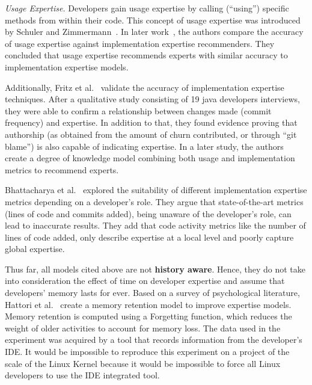 \textit{Usage Expertise.} Developers gain usage expertise by calling (``using'') specific methods from within their code. This concept of usage expertise was introduced by Schuler and Zimmermann~\cite{Schuler:2008:MUE:1370750.1370779}. In later work~\cite{5306386}, the authors compare the accuracy of usage expertise against implementation expertise recommenders. They concluded that usage expertise recommends experts with similar accuracy to implementation expertise models. 

Additionally, Fritz et al.~\cite{Fritz-2007} validate the accuracy of implementation expertise techniques. After a qualitative study consisting of  19 java developers interviews, they were able to confirm a relationship between changes made (commit frequency) and expertise. In addition to that, they found evidence proving that authorship (as obtained from the amount of churn contributed, or through ``git blame'') is also capable of indicating expertise. In a later study, the authors~\cite{Fritz:2010:DMC:1806799.1806856} create a degree of knowledge model combining both usage and implementation metrics to recommend experts.

Bhattacharya et al.~\cite{Bhattacharya} explored the suitability of different implementation expertise metrics depending on a developer's role. They argue that state-of-the-art metrics (lines of code and commits added), being unaware of the developer's role, can lead to inaccurate results. They add that code activity metrics like the number of lines of code added, only describe expertise at a local level and poorly capture global expertise. 


Thus far, all models cited above are not \textbf{history aware}. Hence, they do not take into consideration the effect of time on developer expertise and assume that developers' memory lasts for ever. Based on a survey of psychological literature, Hattori et al.~\cite{Hattori:2012:RCO:2318097.2318145} create a memory retention model to improve expertise models. Memory retention is computed using a Forgetting function, which reduces the weight of older activities to account for memory loss.
The data used in the experiment was acquired by a tool that records information from the developer's IDE. It would be impossible to reproduce this experiment on a project of the scale of the Linux Kernel because it would be impossible to force all Linux developers to use the IDE integrated tool.

